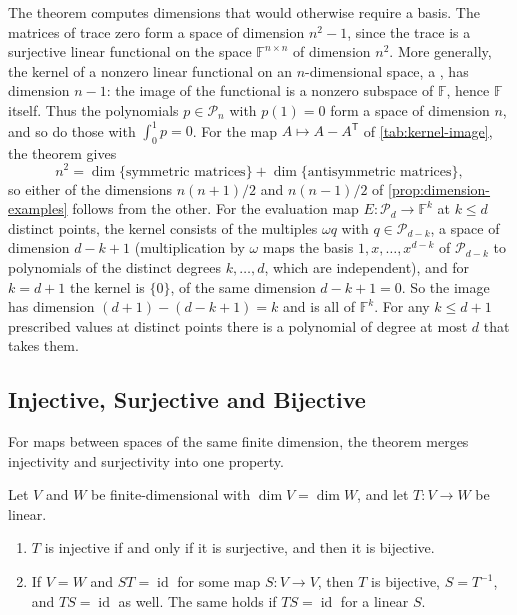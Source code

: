 The theorem computes dimensions that would otherwise require a basis. The matrices of trace zero form a space of dimension $n^2-1$, since the trace is a surjective linear functional on the space $\mathbb F^{n\times n}$ of dimension $n^2$. More generally, the kernel of a nonzero linear functional on an $n$-dimensional space, a , has dimension $n-1$: the image of the functional is a nonzero subspace of $\mathbb F$, hence $\mathbb F$ itself. Thus the polynomials $p\in\mathcal P_n$ with $p(1)=0$ form a space of dimension $n$, and so do those with $\int_0^1p=0$. For the map $A\mapsto A-A^{\mathsf T}$ of \cref{tab:kernel-image}, the theorem gives
\[
n^2=\dim\{\text{symmetric matrices}\}+\dim\{\text{antisymmetric matrices}\},
\]
so either of the dimensions $n(n+1)/2$ and $n(n-1)/2$ of \cref{prop:dimension-examples} follows from the other. For the evaluation map $E\colon\mathcal P_d\to\mathbb F^k$ at $k\le d$ distinct points, the kernel consists of the multiples $\omega q$ with $q\in\mathcal P_{d-k}$, a space of dimension $d-k+1$ (multiplication by $\omega$ maps the basis $1,x,\ldots,x^{d-k}$ of $\mathcal P_{d-k}$ to polynomials of the distinct degrees $k,\ldots,d$, which are independent), and for $k=d+1$ the kernel is $\{0\}$, of the same dimension $d-k+1=0$. So the image has dimension $(d+1)-(d-k+1)=k$ and is all of $\mathbb F^k$. For any $k\le d+1$ prescribed values at distinct points there is a polynomial of degree at most $d$ that takes them.

\subsection{Injective, Surjective and Bijective}

For maps between spaces of the same finite dimension, the theorem merges injectivity and surjectivity into one property.

\begin{corollary}
\label{cor:injective-surjective}
Let $V$ and $W$ be finite-dimensional with $\dim V=\dim W$, and let $T\colon V\to W$ be linear.
\begin{enumerate}
\item $T$ is injective if and only if it is surjective, and then it is bijective.
\item If $V=W$ and $ST=\operatorname{id}$ for some map $S\colon V\to V$, then $T$ is bijective, $S=T^{-1}$, and $TS=\operatorname{id}$ as well. The same holds if $TS=\operatorname{id}$ for a linear $S$.
\end{enumerate}
\end{corollary}

